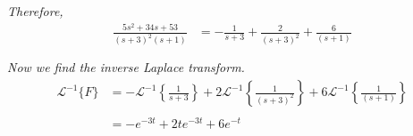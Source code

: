 \documentclass{article}
\begin{document}
    \textit{Therefore,} \\
    \begin{align*}
        \frac{5s^{2} + 34s + 53}{(s + 3)^{2}(s + 1)} &= -\frac{1}{s + 3} + \frac{2}{(s + 3)^{2}} + \frac{6}{(s + 1)} \\ \\
    \end{align*}
    \textit{Now we find the inverse Laplace transform.} \\
    \begin{align*}
        \mathcal{L}^{-1}\{F\} &= -\mathcal{L}^{-1} \left\{ \frac{1}{s + 3}\right\} + 2\mathcal{L}^{-1} \left\{ \frac{1}{(s + 3)^{2}}\right\} + 6\mathcal{L}^{-1} \left\{ \frac{1}{(s + 1)}\right\} \\ \\
        &= -e^{-3t} + 2te^{-3t} + 6e^{-t} \\ \\
    \end{align*}
\end{document}
